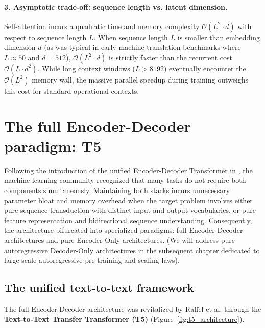 \documentclass[../../main.tex]{subfiles}
\begin{document}
\paragraph{3. Asymptotic trade-off: sequence length vs. latent dimension.}
Self-attention incurs a quadratic time and memory complexity $\mathcal{O}(L^2 \cdot d)$ with respect to sequence length $L$.
When sequence length $L$ is smaller than embedding dimension $d$ (as was typical in early machine translation benchmarks where $L \approx 50$ and $d = 512$), $\mathcal{O}(L^2 \cdot d)$ is strictly faster than the recurrent cost $\mathcal{O}(L \cdot d^2)$. While long context windows ($L > 8192$) eventually encounter the $\mathcal{O}(L^2)$ memory wall, the massive parallel speedup during training outweighs this cost for standard operational contexts.

\clearpage
\section{The full Encoder-Decoder paradigm: T5}
\label{sec:architectural_spectrum}

Following the introduction of the unified Encoder-Decoder Transformer in \cite{vaswani2017}, the machine learning community recognized that many tasks do not require both components simultaneously. Maintaining both stacks incurs unnecessary parameter bloat and memory overhead when the target problem involves either pure sequence transduction with distinct input and output vocabularies, or pure feature representation and bidirectional sequence understanding. Consequently, the architecture bifurcated into specialized paradigms: full Encoder-Decoder architectures and pure Encoder-Only architectures. (We will address pure autoregressive Decoder-Only architectures in the subsequent chapter dedicated to large-scale autoregressive pre-training and scaling laws).

\subsection{The unified text-to-text framework}
\label{subsec:t5_text_to_text}

The full Encoder-Decoder architecture was revitalized by Raffel et al. \cite{raffel2020t5} through the \textbf{Text-to-Text Transfer Transformer (T5)} (Figure~\ref{fig:t5_architecture}).
\end{document}
